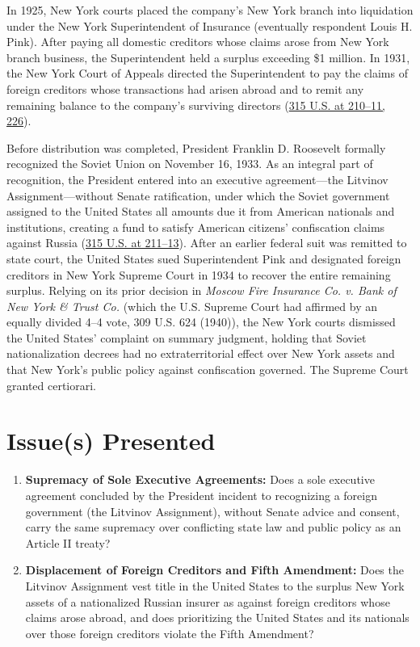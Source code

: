 \documentclass[12pt]{article}
\begin{document}
In 1925, New York courts placed the company's New York branch into liquidation under the New York Superintendent of Insurance (eventually respondent Louis H. Pink). After paying all domestic creditors whose claims arose from New York branch business, the Superintendent held a surplus exceeding \$1 million. In 1931, the New York Court of Appeals directed the Superintendent to pay the claims of foreign creditors whose transactions had arisen abroad and to remit any remaining balance to the company's surviving directors (\href{https://supreme.justia.com/cases/federal/us/315/203/}{315 U.S. at 210--11, 226}).

Before distribution was completed, President Franklin D. Roosevelt formally recognized the Soviet Union on November 16, 1933. As an integral part of recognition, the President entered into an executive agreement---the Litvinov Assignment---without Senate ratification, under which the Soviet government assigned to the United States all amounts due it from American nationals and institutions, creating a fund to satisfy American citizens' confiscation claims against Russia (\href{https://www.law.cornell.edu/supremecourt/text/315/203}{315 U.S. at 211--13}). After an earlier federal suit was remitted to state court, the United States sued Superintendent Pink and designated foreign creditors in New York Supreme Court in 1934 to recover the entire remaining surplus. Relying on its prior decision in \textit{Moscow Fire Insurance Co. v. Bank of New York \& Trust Co.} (which the U.S. Supreme Court had affirmed by an equally divided 4--4 vote, 309 U.S. 624 (1940)), the New York courts dismissed the United States' complaint on summary judgment, holding that Soviet nationalization decrees had no extraterritorial effect over New York assets and that New York's public policy against confiscation governed. The Supreme Court granted certiorari.

\section{Issue(s) Presented}
\begin{enumerate}
  \item \textbf{Supremacy of Sole Executive Agreements:} Does a sole executive agreement concluded by the President incident to recognizing a foreign government (the Litvinov Assignment), without Senate advice and consent, carry the same supremacy over conflicting state law and public policy as an Article II treaty?
  \item \textbf{Displacement of Foreign Creditors and Fifth Amendment:} Does the Litvinov Assignment vest title in the United States to the surplus New York assets of a nationalized Russian insurer as against foreign creditors whose claims arose abroad, and does prioritizing the United States and its nationals over those foreign creditors violate the Fifth Amendment?
\end{enumerate}
\end{document}
